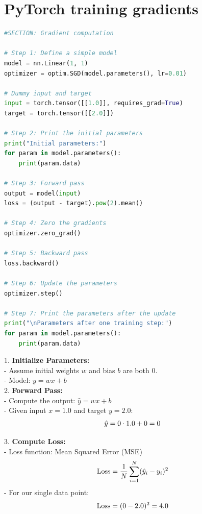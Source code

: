 \documentclass{article}
\begin{document}
\section{PyTorch training gradients}
  \begin{lstlisting}[language=Python, caption=PyTorch training gradients]
  #SECTION: Gradient computation

# Step 1: Define a simple model
model = nn.Linear(1, 1)
optimizer = optim.SGD(model.parameters(), lr=0.01)

# Dummy input and target
input = torch.tensor([[1.0]], requires_grad=True)
target = torch.tensor([[2.0]])

# Step 2: Print the initial parameters
print("Initial parameters:")
for param in model.parameters():
    print(param.data)

# Step 3: Forward pass
output = model(input)
loss = (output - target).pow(2).mean()

# Step 4: Zero the gradients
optimizer.zero_grad()

# Step 5: Backward pass
loss.backward()

# Step 6: Update the parameters
optimizer.step()

# Step 7: Print the parameters after the update
print("\nParameters after one training step:")
for param in model.parameters():
    print(param.data)

\end{lstlisting}

1. \textbf{Initialize Parameters:}\\
   - Assume initial weights \( w \) and bias \( b \) are both 0.\\
   - Model: \( y = wx + b \) \\

2. \textbf{Forward Pass:} \\
   - Compute the output: \( \hat{y} = wx + b \) \\
   - Given input \( x = 1.0 \) and target \( y = 2.0 \): \\
     \[
     \hat{y} = 0 \cdot 1.0 + 0 = 0 \\
     \]

3. \textbf{Compute Loss:} \\
   - Loss function: Mean Squared Error (MSE) \\
     \[
     \text{Loss} = \frac{1}{N} \sum_{i=1}^{N} (\hat{y}_i - y_i)^2 \\
     \]
   - For our single data point: \\
     \[
     \text{Loss} = (0 - 2.0)^2 = 4.0  \\
     \]
\end{document}
